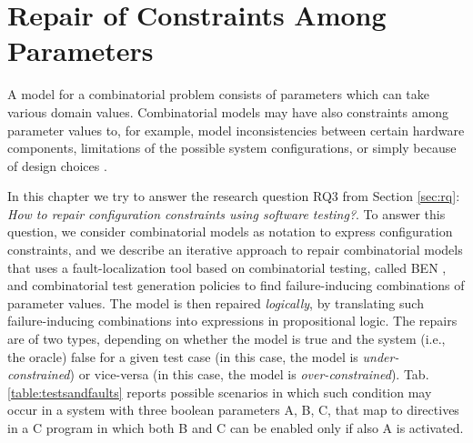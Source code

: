 \chapter{Repair of Constraints Among Parameters}\label{ch:constraintrepair}
A model for a combinatorial problem consists of parameters which can take various domain values. Combinatorial models may have also constraints among parameter values to, for example, model inconsistencies between certain hardware components, limitations of the possible system configurations, or simply because of design choices \cite{gargantini_combinatorial_2017}.

In this chapter we try to answer the research question RQ3 from Section \ref{sec:rq}: \textit{How to repair configuration constraints using software testing?}. To answer this question, we consider combinatorial models as notation to express configuration constraints, and we describe an iterative approach to repair combinatorial models that uses a fault-localization tool based on combinatorial testing, called BEN \cite{ghandehari2018combinatorial}, and combinatorial test generation policies to find failure-inducing combinations of parameter values.
The model is then repaired \textit{logically}, by translating such failure-inducing combinations into expressions in propositional logic.
The repairs are of two types, depending on whether the model is true and the system (i.e., the oracle) false for a given test case (in this case, the model is \textit{under-constrained}) or vice-versa (in this case, the model is \textit{over-constrained}). Tab. \ref{table:testsandfaults} reports possible scenarios in which such condition may occur in a system with three boolean parameters A, B, C, that map to directives in a C program in which both B and C can be enabled only if also A is activated.
